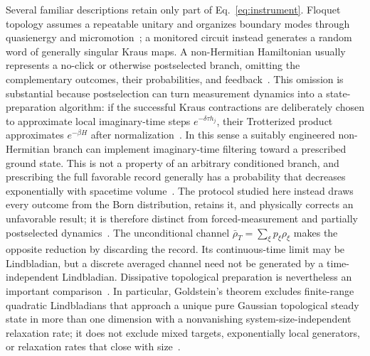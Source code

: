 \documentclass[aps,prb,twocolumn,superscriptaddress,longbibliography]{revtex4-2}
\theoremstyle{plain}
\theoremstyle{definition}
\theoremstyle{remark}
\begin{document}
Several familiar descriptions retain only part of Eq.~\eqref{eq:instrument}.  Floquet topology assumes a repeatable unitary and organizes boundary modes through quasienergy and micromotion~\cite{Kitagawa2010,Lindner2011,Rudner2013,Harper2020}; a monitored circuit instead generates a random word of generally singular Kraus maps.  A non-Hermitian Hamiltonian usually represents a no-click or otherwise postselected branch, omitting the complementary outcomes, their probabilities, and feedback~\cite{Gong2018,Fleckenstein2022,Kells2023,Leung2025}.  This omission is substantial because postselection can turn measurement dynamics into a state-preparation algorithm: if the successful Kraus contractions are deliberately chosen to approximate local imaginary-time steps $e^{-\delta\tau h_j}$, their Trotterized product approximates $e^{-\beta H}$ after normalization~\cite{Kosugi2022}.  In this sense a suitably engineered non-Hermitian branch can implement imaginary-time filtering toward a prescribed ground state.  This is not a property of an arbitrary conditioned branch, and prescribing the full favorable record generally has a probability that decreases exponentially with spacetime volume~\cite{LiZou2023,GarrattAltman2024}.  The protocol studied here instead draws every outcome from the Born distribution, retains it, and physically corrects an unfavorable result; it is therefore distinct from forced-measurement and partially postselected dynamics~\cite{JianShapourian2023,Leung2025}.  The unconditional channel $\bar\rho_T=\sum_\xi p_\xi\rho_\xi$ makes the opposite reduction by discarding the record.  Its continuous-time limit may be Lindbladian, but a discrete averaged channel need not be generated by a time-independent Lindbladian.  Dissipative topological preparation is nevertheless an important comparison~\cite{Diehl2011,Bardyn2013,Budich2015,Lieu2020,Altland2021}.  In particular, Goldstein's theorem excludes finite-range quadratic Lindbladians that approach a unique pure Gaussian topological steady state in more than one dimension with a nonvanishing system-size-independent relaxation rate; it does not exclude mixed targets, exponentially local generators, or relaxation rates that close with size~\cite{Goldstein2019}.
\end{document}
